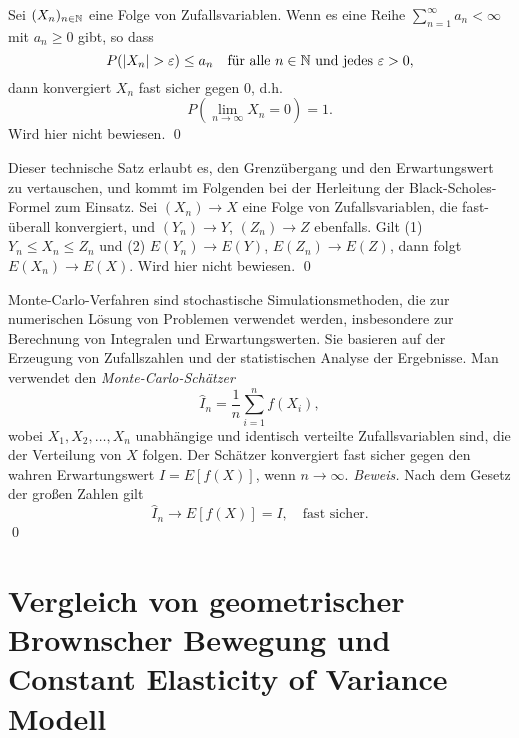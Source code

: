 \begin{lemma}
Sei $(X_n)_{n \in \Bbb N}$ eine Folge von Zufallsvariablen. Wenn es eine Reihe $\sum_{n=1}^\infty a_n \lt \infty$ mit $a_n \geq 0$ gibt, so dass
$$P(|X_n| > \varepsilon) \leq a_n \quad \text{für alle } n \in \Bbb N \text{ und jedes } \varepsilon > 0,$$
dann konvergiert $X_n$ fast sicher gegen $0$, d.h.
$$P\left(\lim_{n \to \infty} X_n = 0\right) = 1.$$
Wird hier nicht bewiesen. \qed
\end{lemma}

\begin{satz}
Dieser technische Satz erlaubt es, den Grenzübergang und den Erwartungswert zu vertauschen, und
kommt im Folgenden bei der Herleitung der Black-Scholes-Formel zum Einsatz.
Sei $(X_n) \longrightarrow X$ eine Folge von Zufallsvariablen, die fast-überall konvergiert,
und $(Y_n) \longrightarrow Y$, $(Z_n) \longrightarrow Z$ ebenfalls.
Gilt (1) $Y_n \le X_n \le Z_n$ und (2) $E(Y_n) \longrightarrow E(Y)$, $E(Z_n) \longrightarrow E(Z)$,
dann folgt $E(X_n) \longrightarrow E(X)$. Wird hier nicht bewiesen. \qed
\end{satz}

\begin{defprop}
Monte-Carlo-Verfahren sind stochastische Simulationsmethoden, die zur numerischen
Lösung von Problemen verwendet werden, insbesondere zur Berechnung von Integralen
und Erwartungswerten. Sie basieren auf der Erzeugung von Zufallszahlen und
der statistischen Analyse der Ergebnisse. Man verwendet den \textit{Monte-Carlo-Schätzer}
$$
\hat{I}_n = \frac{1}{n} \sum_{i=1}^n f(X_i),
$$
wobei $X_1, X_2, \ldots, X_n$ unabhängige und identisch verteilte Zufallsvariablen
sind, die der Verteilung von $X$ folgen. Der Schätzer konvergiert fast sicher
gegen den wahren Erwartungswert $I = E[f(X)]$, wenn $n \to \infty$.
\textit{Beweis.} Nach dem Gesetz der großen Zahlen gilt
$$\hat{I}_n \longrightarrow E[f(X)] = I, \quad \text{fast sicher.}$$ \qed
\end{defprop}
\newpage
\section{Vergleich von geometrischer Brownscher Bewegung und Constant Elasticity of Variance Modell}

\begin{center}
    \begin{sideways}
    \end{sideways}
    \label{fig:table_gbm_cev}
\end{center}
